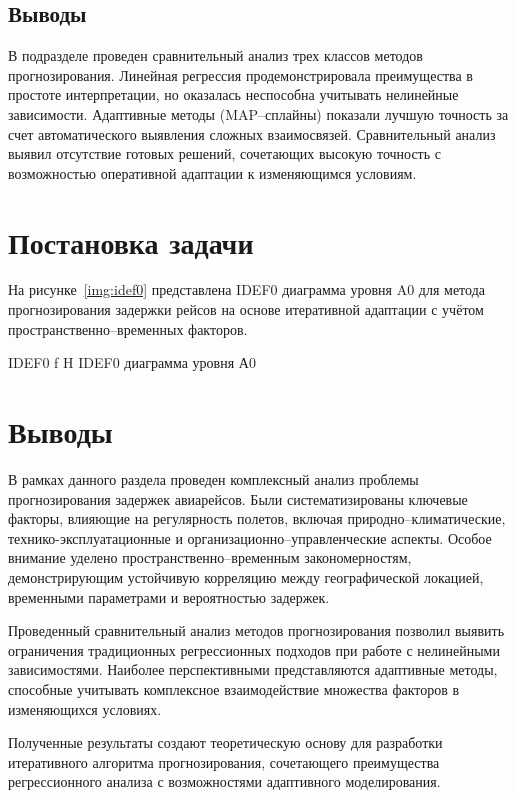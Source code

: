 \subsection*{Выводы}

В подразделе проведен сравнительный анализ трех классов методов прогнозирования.
Линейная регрессия продемонстрировала преимущества в простоте интерпретации, но оказалась неспособна учитывать нелинейные зависимости.
Адаптивные методы (MAP--сплайны) показали лучшую точность за счет автоматического выявления сложных взаимосвязей.
Сравнительный анализ выявил отсутствие готовых решений, сочетающих высокую точность с возможностью оперативной адаптации к изменяющимся условиям.


\section{Постановка задачи}

На рисунке~\ref{img:idef0} представлена IDEF0 диаграмма уровня A0 для метода прогнозирования задержки рейсов на основе итеративной адаптации с учётом пространственно--временных факторов.

{IDEF0}
{f}
{H}
{\textwidth}
{IDEF0 диаграмма уровня А0}

\section*{Выводы}
В рамках данного раздела проведен комплексный анализ проблемы прогнозирования задержек авиарейсов.
Были систематизированы ключевые факторы, влияющие на регулярность полетов, включая природно--климатические, технико-эксплуатационные и организационно--управленческие аспекты.
Особое внимание уделено пространственно--временным закономерностям, демонстрирующим устойчивую корреляцию между географической локацией, временными параметрами и вероятностью задержек.

Проведенный сравнительный анализ методов прогнозирования позволил выявить ограничения традиционных регрессионных подходов при работе с нелинейными зависимостями.
Наиболее перспективными представляются адаптивные методы, способные учитывать комплексное взаимодействие множества факторов в изменяющихся условиях.

Полученные результаты создают теоретическую основу для разработки итеративного алгоритма прогнозирования, сочетающего преимущества регрессионного анализа с возможностями адаптивного моделирования.